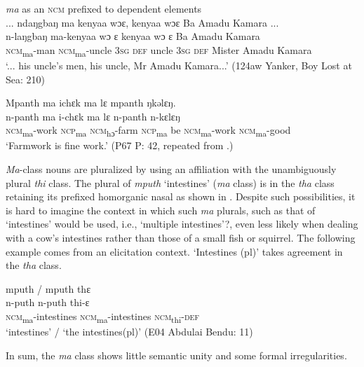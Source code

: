 \ea%
    \label{ex:150}
    \textit{ma} as an \textsc{ncm} prefixed to dependent elements\\
    \ea\label{ex:150a} ... ndaŋgbaŋ ma kenyaa wɔɛ, kenyaa wɔɛ Ba Amadu Kamara ...\\
    \gll n-laŋgbaŋ    ma-kenyaa    wɔ    ɛ    kenyaa  wɔ    ɛ    Ba      Amadu  Kamara\\
    \textsc{ncm}\textsubscript{ma}{}-man    \textsc{ncm}\textsubscript{ma}{}-uncle  3\textsc{sg}  \textsc{def}  uncle    \textsc{3sg}  \textsc{def}  Mister  Amadu  Kamara\\
    \glt ‘... his uncle's men, his uncle, Mr Amadu Kamara...' (124aw Yanker, Boy Lost at Sea: 210)

\ex\label{ex:150b} Mpanth ma ichɛk ma lɛ mpanth ŋkəlɛŋ.\\
    \gll n-panth      ma    i-chɛk      ma    lɛ    n-panth      n-kɛlɛŋ\\
    \textsc{ncm}\textsubscript{ma}\textsc{{}-}work  \textsc{ncp}\textsubscript{ma}    \textsc{ncm}\textsubscript{hɔ}\textsc{{}-}farm    \textsc{ncp}\textsubscript{ma}    be    \textsc{ncm}\textsubscript{ma}\textsc{{}-}work  \textsc{ncm}\textsubscript{ma}\textsc{{}-}good\\
    \glt ‘Farmwork is fine work.' (P67 P: 42, repeated from .)
\z
\z

\textit{Ma}{}-class nouns are pluralized by using an affiliation with the unambiguously plural \textit{thi} class. The plural of \textit{mputh} ‘intestines' (\textit{ma} class) is in the \textit{tha} class retaining its prefixed homorganic nasal as shown in . Despite such possibilities, it is hard to imagine the context in which such \textit{ma} plurals, such as that of ‘intestines' would be used, i.e., ‘multiple intestines'?, even less likely when dealing with a cow's intestines rather than those of a small fish or squirrel. The following example comes from an elicitation context. ‘Intestines (pl)' takes agreement in the \textit{tha} class.

\ea%
    \label{ex:151}
    mputh / mputh thɛ\\
    \gll n-puth            n-puth           thi-ɛ\\
    \textsc{ncm}\textsubscript{ma}{}-intestines      \textsc{ncm}\textsubscript{ma}{}-intestines    \textsc{ncm}\textsubscript{thi}{}-\textsc{def}\\
    \glt ‘intestines' / ‘the intestines(pl)' (E04 Abdulai Bendu: 11)
\z

In sum, the \textit{ma} class shows little semantic unity and some formal irregularities.


